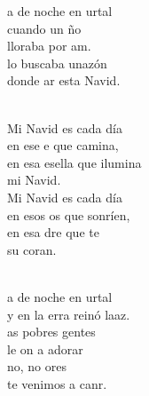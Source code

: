 \begin{cancion}[Mi Navidad][]%
	a de noche en urtal\\
	cuando un ño\\
	lloraba por am.\\
	lo buscaba unazón \\
	donde ar esta Navid.\\\jump\\
	\begin{chorus}%
	Mi Navid es cada día\\
	en ese e que camina,\\
	en esa esella que ilumina\\
	mi Navid.\\
	Mi Navid es cada día\\
	en esos os que sonríen,\\
	en esa dre que te \\
	su coran. \\
	\end{chorus}%
	\jump\\
	a de noche en urtal\\
	y en la erra reinó laaz.\\
	as pobres gentes\\
	le on a adorar\\
	no, no ores\\
	te venimos a canr.\\
\end{cancion}%
